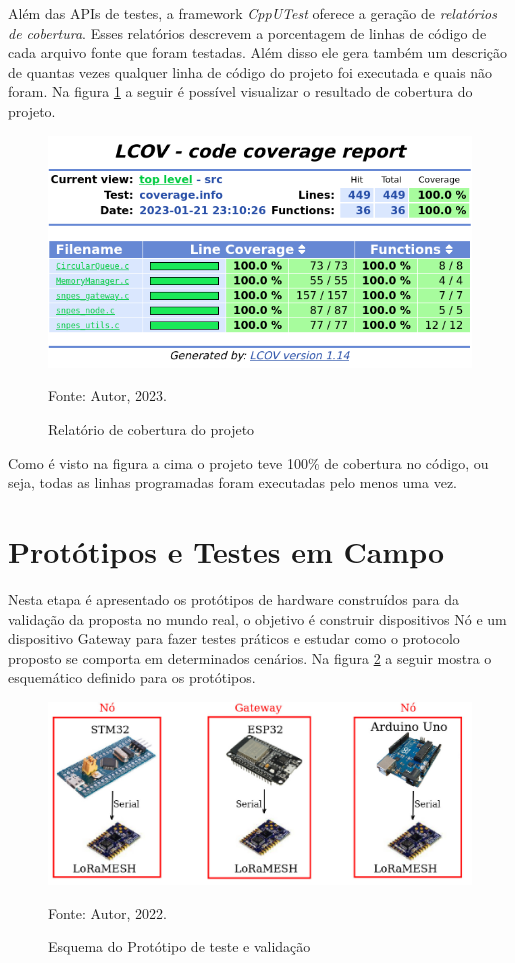 Além das APIs de testes, a framework \textit{CppUTest} oferece a geração de
\textit{relatórios de cobertura}. Esses relatórios descrevem a porcentagem de
linhas de código de cada arquivo fonte que foram testadas. Além disso ele
gera também um descrição de quantas vezes qualquer linha de código do projeto
foi executada e quais não foram. Na figura \ref{fig:cov} a seguir é possível
visualizar o resultado de cobertura do projeto.

\begin{figure}[H]
    \centering
	\caption{Relatório de cobertura do projeto}
    \includegraphics[height=0.225\textheight,keepaspectratio]{img/cov.png}
    \label{fig:cov}
    
    Fonte: Autor, 2023.
\end{figure}

Como é visto na figura a cima o projeto teve 100\% de cobertura no código,
ou seja, todas as linhas programadas foram executadas pelo menos uma vez.

\section{Protótipos e Testes em Campo}

Nesta etapa é apresentado os protótipos de hardware construídos para da validação da proposta
no mundo real, o objetivo é construir dispositivos Nó e um dispositivo
Gateway para fazer testes práticos e estudar como o protocolo proposto se comporta
em determinados cenários.
Na figura \ref{fig:prototipo} a seguir mostra o esquemático definido para os protótipos.

\begin{figure}[H]
    \centering
	\caption{Esquema do Protótipo de teste e validação}
    \includegraphics[height=0.21\textheight,keepaspectratio]{img/prop.jpg}
    \label{fig:prototipo}
    
    Fonte: Autor, 2022.
\end{figure}

